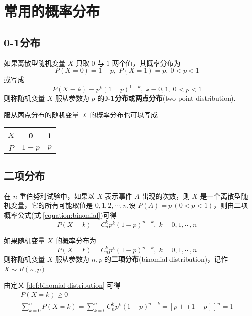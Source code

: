 \section{常用的概率分布}

\subsection{0-1分布}

\begin{definition}
    \indent 如果离散型随机变量 $X$ 只取 $0$ 与 $1$ 两个值，其概率分布为
    $$
    P(X=0)=1-p, \; P(X=1)=p, \; 0<p<1
    $$
    或写成
    $$
    P(X=k)=p^k (1-p)^{1-k}, \; k=0,1, \; 0<p<1
    $$
    则称随机变量 $X$ 服从参数为 $p$ 的\textbf{0-1分布}或\textbf{两点分布}(two-point distribution).
\end{definition}

服从两点分布的随机变量 $X$ 的概率分布也可以写成
\begin{table*}[htbp]
    \centering

    \begin{tabular}{c | c c}
        \hline
        $X$ & 0 & 1 \\
        \hline
        $P$ & $1-p$ & $p$ \\
        \hline
    \end{tabular}
\end{table*}

\subsection{二项分布}

在 $n$ 重伯努利试验中，如果以 $X$ 表示事件 $A$ 出现的次数，则 $X$ 是一个离散型随机变量，它的所有可能取值是 $0,1,2,\cdots,n$.设 $P(A)=p\,(0<p<1)$，则由二项概率公式(式 \eqref{equation:binomial})可得
$$
P(X=k)=C_n^k p^k (1-p)^{n-k}, \; k=0,1,\cdots,n
$$

\begin{definition}
    \indent 如果随机变量 $X$ 的概率分布为
    $$
    P(X=k)=C_n^k p^k (1-p)^{n-k}, \; k=0,1,\cdots,n
    $$
    则称随机变量 $X$ 服从参数为 $n,p$ 的\textbf{二项分布}(binomial distribution)，记作 $X \sim B(n,p)$.
\end{definition}

由定义 \ref{def:binomial distribution} 可得
\begin{gather*}
    P(X=k) \geqslant 0\\
    \sum_{k=0}^n P(X=k) = \sum_{k=0}^n C_n^k p^k (1-p)^{n-k} = [p+(1-p)]^n=1
\end{gather*}

